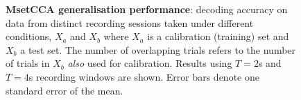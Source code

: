 \begin{figure}[!htb]
\hfill
{}
\caption[MsetCCA generalisation performance: test decoding accuracy when calibrating and testing on data collected from distinct sessions under different conditions]{\textbf{MsetCCA generalisation performance}: decoding accuracy on data from distinct recording sessions taken under different conditions, $X_a$ and $X_b$ where $X_a$ is a calibration (training) set and $X_b$ a test set. The number of overlapping trials refers to the number of trials in $X_b$ \textit{also} used for calibration. Results using $T=2$s and $T=4$s recording windows are shown. Error bars denote one standard error of the mean.}
\label{fig:gt-results-mcca}
\end{figure}



